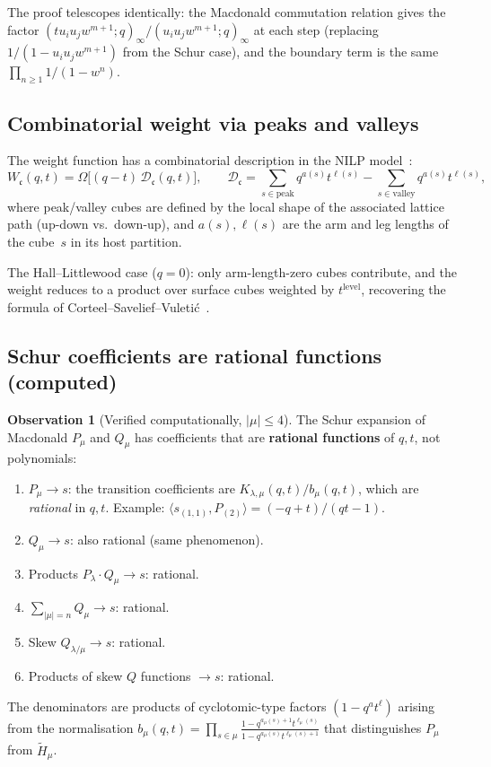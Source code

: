 \documentclass[11pt]{article}
\theoremstyle{plain}
\theoremstyle{definition}
\newtheorem{observation}[theorem]{Observation}
\theoremstyle{remark}
\begin{document}
The proof telescopes identically: the Macdonald commutation
relation gives the factor
$(tu_iu_jw^{m+1}; q)_\infty / (u_iu_jw^{m+1}; q)_\infty$
at each step (replacing $1/(1 - u_iu_jw^{m+1})$ from the
Schur case), and the boundary term is the same
$\prod_{n \geq 1} 1/(1 - w^n)$.

\subsection{Combinatorial weight via peaks and valleys}

The weight function has a combinatorial description in the
NILP model~\cite{langer-thesis}:
\begin{equation}\label{eq:mac-weight}
  W_{\mathfrak{c}}(q,t) =
  \Omega\bigl[(q-t)\,\mathcal{D}_{\mathfrak{c}}(q,t)\bigr],
  \qquad
  \mathcal{D}_{\mathfrak{c}} =
  \sum_{s \in \mathrm{peak}} q^{a(s)} t^{\ell(s)}
  - \sum_{s \in \mathrm{valley}} q^{a(s)} t^{\ell(s)},
\end{equation}
where peak/valley cubes are defined by the local shape of the
associated lattice path (up-down vs.\ down-up), and
$a(s), \ell(s)$ are the arm and leg lengths of the cube~$s$ in
its host partition.

The Hall--Littlewood case ($q = 0$): only arm-length-zero cubes
contribute, and the weight reduces to a product over surface cubes
weighted by $t^{\mathrm{level}}$, recovering the formula of
Corteel--Savelief--Vuleti\'c~\cite{csv-2009}.

\subsection{Schur coefficients are rational functions (computed)}
\label{sec:mac-schur-rational}

\begin{observation}[Verified computationally, $|\mu| \leq 4$]
\label{obs:mac-schur-rational}
The Schur expansion of Macdonald $P_\mu$ and $Q_\mu$ has
coefficients that are \textbf{rational functions} of $q,t$,
not polynomials:
\begin{enumerate}
  \item $P_\mu \to s$: the transition coefficients are
    $K_{\lambda,\mu}(q,t) / b_\mu(q,t)$, which are \emph{rational}
    in $q,t$.  Example: $\langle s_{(1,1)}, P_{(2)} \rangle
    = (-q+t)/(qt-1)$.
  \item $Q_\mu \to s$: also rational (same phenomenon).
  \item Products $P_\lambda \cdot Q_\mu \to s$: rational.
  \item $\sum_{|\mu|=n} Q_\mu \to s$: rational.
  \item Skew $Q_{\lambda/\mu} \to s$: rational.
  \item Products of skew $Q$ functions $\to s$: rational.
\end{enumerate}
The denominators are products of cyclotomic-type factors
$(1 - q^a t^\ell)$ arising from the normalisation
$b_\mu(q,t) = \prod_{s \in \mu}
\frac{1 - q^{a_\mu(s)+1} t^{\ell_\mu(s)}}
     {1 - q^{a_\mu(s)} t^{\ell_\mu(s)+1}}$
that distinguishes $P_\mu$ from $\tilde{H}_\mu$.
\end{observation}
\end{document}
